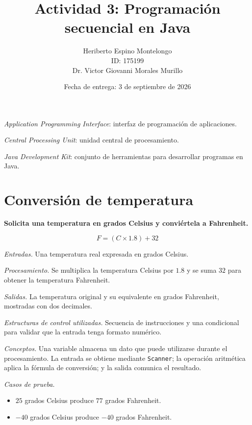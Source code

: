 \documentclass[12pt,oneside]{template/liverpoolthesis}
\title{Actividad 3: Programación secuencial en Java}
\author{%
  Heriberto Espino Montelongo\\
  ID: 175199\\[1em]
  \text{Profesor:} Dr. Victor Giovanni Morales Murillo}
\date{Fecha de entrega: 3 de septiembre de 2026}
\begin{document}
\frontmatter
\maketitle
\tableofcontents
\listoffigures

\begin{abbreviations}
  \item[API] \textit{Application Programming Interface}: interfaz de programación
  de aplicaciones.
  \item[CPU] \textit{Central Processing Unit}: unidad central de procesamiento.
  \item[JDK] \textit{Java Development Kit}: conjunto de herramientas para
  desarrollar programas en Java.
\end{abbreviations}

\mainmatter

\chapter{Conversión de temperatura}

\textbf{Solicita una temperatura en grados Celsius y conviértela a Fahrenheit.}

\[
  F = (C \times 1.8) + 32
\]

\emph{Entradas.} Una temperatura real expresada en grados Celsius.

\emph{Procesamiento.} Se multiplica la temperatura Celsius por $1.8$ y se suma
$32$ para obtener la temperatura Fahrenheit.

\emph{Salidas.} La temperatura original y su equivalente en grados Fahrenheit,
mostradas con dos decimales.

\emph{Estructuras de control utilizadas.} Secuencia de instrucciones y una
condicional para validar que la entrada tenga formato numérico.

\emph{Conceptos.} Una variable almacena un dato que puede utilizarse durante
el procesamiento. La entrada se obtiene mediante \texttt{Scanner}; la operación
aritmética aplica la fórmula de conversión; y la salida comunica el resultado.

\emph{Casos de prueba.}
\begin{itemize}
  \item $25$ grados Celsius produce $77$ grados Fahrenheit.
  \item $-40$ grados Celsius produce $-40$ grados Fahrenheit.
\end{itemize}
\end{document}
